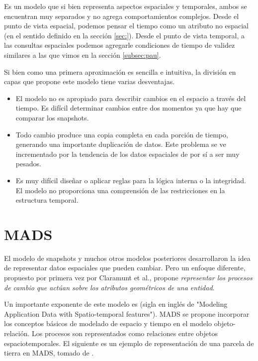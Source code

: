 Es un modelo que si bien representa aspectos espaciales y temporales,
ambos se encuentran muy separados y no agrega comportamientos complejos.
Desde el punto de vista espacial,
podemos pensar el tiempo como un atributo no espacial (en el sentido definido en la sección \ref{sec:}).
Desde el punto de vista temporal,
a las consultas espaciales podemos agregarle condiciones de tiempo de validez similares a las que vimos en la sección \ref{subsec:pau}.

Si bien como una primera aproximación es sencilla e intuitiva, la división en capas que propone este modelo tiene varias desventajas.
\begin{itemize}
    \item El modelo no es apropiado para describir cambios en el espacio a través del tiempo.
        Es difícil determinar cambios entre dos momentos ya que hay que comparar los snapshots.
    \item Todo cambio produce una copia completa en cada porción de tiempo,
        generando una importante duplicación de datos.
        Este problema se ve incrementado por la tendencia de los datos espaciales de por sí a ser muy pesados.
    \item Es muy difícil diseñar o aplicar reglas para la lógica interna o la integridad.
        El modelo no proporciona una comprensión de las restricciones en la estructura temporal.
\end{itemize}


\section{MADS}

El modelo de snapshots y muchos otros modelos posteriores desarrollaron la idea de representar datos espaciales que pueden cambiar.
Pero un enfoque diferente, propuesto por primera vez por Claramunt et al.\textsuperscript{\cite{CPS98}}, propone \textit{representar los procesos de cambio que actúan sobre los atributos geométricos de una entidad}.

Un importante exponente de este modelo es \textsuperscript{\cite{PSZ99}}
(sigla en inglés de "Modeling Application Data with Spatio-temporal features").
MADS se propone incorporar los conceptos básicos de modelado de espacio y tiempo en el modelo objeto-relación.
Los procesos son representados como relaciones entre objetos espaciotemporales. El siguiente es un ejemplo de representación de una parcela de tierra en MADS, tomado de \cite{sp:litreview}.

